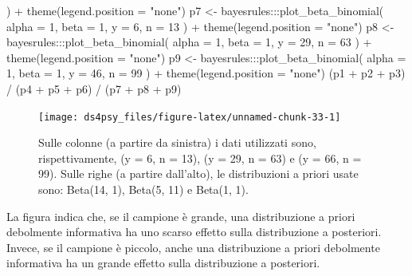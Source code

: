 \documentclass[
  11pt,
]{krantz}
\makeatletter
\newenvironment{Shaded}{\begin{snugshade}}{\end{snugshade}}
\newcommand{\AttributeTok}[1]{\textcolor[rgb]{0.61,0.61,0.61}{#1}}
\newcommand{\DecValTok}[1]{\textcolor[rgb]{0.06,0.06,0.06}{#1}}
\newcommand{\FunctionTok}[1]{\textcolor[rgb]{0,0,0}{#1}}
\newcommand{\NormalTok}[1]{#1}
\newcommand{\OtherTok}[1]{\textcolor[rgb]{0.37,0.37,0.37}{#1}}
\newcommand{\SpecialCharTok}[1]{\textcolor[rgb]{0,0,0}{#1}}
\newcommand{\StringTok}[1]{\textcolor[rgb]{0.5,0.5,0.5}{#1}}
\newenvironment{kframe}{%
\medskip{}
\setlength{\fboxsep}{.8em}
 \def\at@end@of@kframe{}%
 \ifinner\ifhmode%
  \def\at@end@of@kframe{\end{minipage}}%
  \begin{minipage}{\columnwidth}%
 \fi\fi%
 \def\FrameCommand##1{\hskip\@totalleftmargin \hskip-\fboxsep
 \colorbox{shadecolor}{##1}\hskip-\fboxsep
     \hskip-\linewidth \hskip-\@totalleftmargin \hskip\columnwidth}%
 \MakeFramed {\advance\hsize-\width
   \@totalleftmargin\z@ \linewidth\hsize
   \@setminipage}}%
 {\par\unskip\endMakeFramed%
 \at@end@of@kframe}
\renewenvironment{Shaded}{\begin{kframe}}{\end{kframe}}
\theoremstyle{definition}
\theoremstyle{definition}
\theoremstyle{definition}
\theoremstyle{definition}
\theoremstyle{remark}
\makeatother
\begin{document}
\begin{Shaded}
\begin{Highlighting}[]
\NormalTok{  ) }\SpecialCharTok{+}
  \FunctionTok{theme}\NormalTok{(}\AttributeTok{legend.position =} \StringTok{"none"}\NormalTok{) }
\NormalTok{p7 }\OtherTok{\textless{}{-}}\NormalTok{ bayesrules}\SpecialCharTok{:::}\FunctionTok{plot\_beta\_binomial}\NormalTok{(}
  \AttributeTok{alpha =} \DecValTok{1}\NormalTok{, }\AttributeTok{beta =} \DecValTok{1}\NormalTok{, }\AttributeTok{y =} \DecValTok{6}\NormalTok{, }\AttributeTok{n =} \DecValTok{13}
\NormalTok{  ) }\SpecialCharTok{+}
  \FunctionTok{theme}\NormalTok{(}\AttributeTok{legend.position =} \StringTok{"none"}\NormalTok{) }
\NormalTok{p8 }\OtherTok{\textless{}{-}}\NormalTok{ bayesrules}\SpecialCharTok{:::}\FunctionTok{plot\_beta\_binomial}\NormalTok{(}
  \AttributeTok{alpha =} \DecValTok{1}\NormalTok{, }\AttributeTok{beta =} \DecValTok{1}\NormalTok{, }\AttributeTok{y =} \DecValTok{29}\NormalTok{, }\AttributeTok{n =} \DecValTok{63}
\NormalTok{  ) }\SpecialCharTok{+}
  \FunctionTok{theme}\NormalTok{(}\AttributeTok{legend.position =} \StringTok{"none"}\NormalTok{) }
\NormalTok{p9 }\OtherTok{\textless{}{-}}\NormalTok{ bayesrules}\SpecialCharTok{:::}\FunctionTok{plot\_beta\_binomial}\NormalTok{(}
  \AttributeTok{alpha =} \DecValTok{1}\NormalTok{, }\AttributeTok{beta =} \DecValTok{1}\NormalTok{, }\AttributeTok{y =} \DecValTok{46}\NormalTok{, }\AttributeTok{n =} \DecValTok{99}
\NormalTok{  ) }\SpecialCharTok{+}
  \FunctionTok{theme}\NormalTok{(}\AttributeTok{legend.position =} \StringTok{"none"}\NormalTok{) }
\NormalTok{(p1 }\SpecialCharTok{+}\NormalTok{ p2 }\SpecialCharTok{+}\NormalTok{ p3) }\SpecialCharTok{/}\NormalTok{ (p4 }\SpecialCharTok{+}\NormalTok{ p5 }\SpecialCharTok{+}\NormalTok{ p6) }\SpecialCharTok{/}\NormalTok{ (p7 }\SpecialCharTok{+}\NormalTok{ p8 }\SpecialCharTok{+}\NormalTok{ p9)}
\end{Highlighting}
\end{Shaded}

\begin{figure}[h]

{\centering \texttt{[image: ds4psy\_files/figure-latex/unnamed-chunk-33-1]} 

}

\caption{Sulle colonne (a partire da sinistra) i dati utilizzati sono, rispettivamente, (y = 6, n = 13), (y = 29, n = 63) e (y = 66, n = 99). Sulle righe (a partire dall'alto), le distribuzioni a priori usate sono: Beta(14, 1), Beta(5, 11) e Beta(1, 1).}\label{fig:unnamed-chunk-33}
\end{figure}

La figura indica che, se il campione è grande, una distribuzione a priori debolmente informativa ha uno scarso effetto sulla distribuzione a posteriori. Invece, se il campione è piccolo, anche una distribuzione a priori debolmente informativa ha un grande effetto sulla distribuzione a posteriori.
\end{document}
